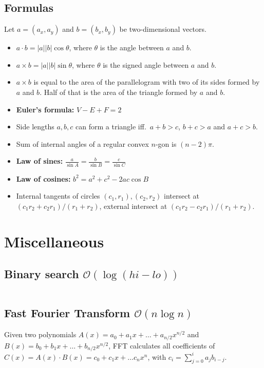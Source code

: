 \documentclass[8pt,a4paper,landscape,oneside]{amsart}
\newcommand{\code}[1]{\inputminted[fontsize=\normalsize,baselinestretch=1,breaklines,tabsize=2]{cpp}{code/#1}}
\begin{document}
\begin{multicols*}{3}
\subsection{Formulas}
        Let $a = (a_x, a_y)$ and $b = (b_x, b_y)$ be two-dimensional vectors.
        \begin{itemize}
            \item $a\cdot b = |a||b|\cos{\theta}$, where $\theta$ is the angle
                between $a$ and $b$.
            \item $a\times b = |a||b|\sin{\theta}$, where $\theta$ is the
                signed angle between $a$ and $b$.
            \item $a\times b$ is equal to the area of the parallelogram with
                two of its sides formed by $a$ and $b$. Half of that is the
                area of the triangle formed by $a$ and $b$.
            \item \textbf{Euler's formula:} $V - E + F = 2$
            \item Side lengths $a,b,c$ can form a triangle iff.\ $a+b>c$, $b+c>a$ and $a+c>b$.
            \item Sum of internal angles of a regular convex $n$-gon is $(n-2)\pi$.
            \item \textbf{Law of sines:} $\frac{a}{\sin A} = \frac{b}{\sin B} = \frac{c}{\sin C}$
            \item \textbf{Law of cosines:} $b^2 = a^2 + c^2 - 2ac\cos B$
            \item Internal tangents of circles $(c_1,r_1), (c_2,r_2)$ intersect at $(c_1r_2+c_2r_1)/(r_1+r_2)$, external intersect at $(c_1r_2-c_2r_1)/(r_1+r_2)$.
        \end{itemize}

\section{Miscellaneous}
\subsection{Binary search $\mathcal{O}(\log (hi - lo))$}

\code{binary_search.cpp}

\subsection{Fast Fourier Transform $\mathcal{O}(n \log n)$}

Given two polynomials $A(x) = a_0 + a_1 x + \dots + a_{n/2} x^{n/2}$ and $B(x) = b_0 + b_1 x + \dots + b_{n/2} x^{n/2}$, FFT calculates all coefficients of $C(x) = A(x) \cdot B(x) = c_0 + c_1 x + \dots c_{n} x^{n}$, with $c_i = \sum_{j=0}^{i} a_j b_{i-j}$.


\end{multicols*}
\end{document}
